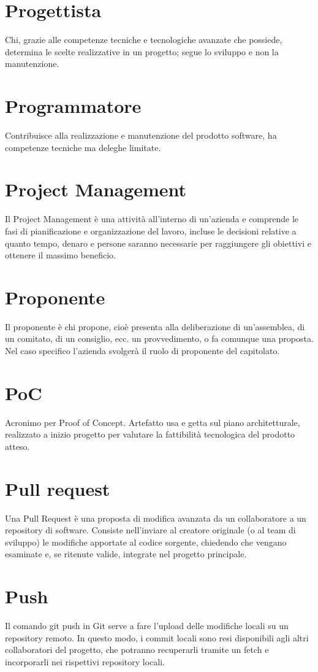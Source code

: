 \section{Progettista}\label{sec:Progettisti}
Chi, grazie alle competenze tecniche e tecnologiche avanzate che possiede, determina le scelte realizzative in un progetto; segue lo sviluppo e non la manutenzione.

\section{Programmatore}\label{sec:Programmatori}
Contribuisce alla realizzazione e manutenzione del prodotto software, ha competenze tecniche ma deleghe limitate.

\section{Project Management}
Il Project Management è una attività all’interno di un’azienda e comprende le fasi di pianificazione e organizzazione del lavoro, incluse le decisioni relative a quanto tempo, denaro e persone saranno necessarie per raggiungere gli obiettivi e ottenere il massimo beneficio. 

\section{Proponente}\label{sec:Proponenti}
Il proponente è chi propone, cioè presenta alla deliberazione di un'assemblea, di un comitato, di un consiglio, ecc. un provvedimento, o fa comunque una proposta. Nel caso specifico l'azienda  svolgerà il ruolo di proponente del capitolato.

\section{PoC}\label{sec:Proof of Concept}
Acronimo per Proof of Concept. Artefatto usa e getta sul piano architetturale, realizzato a inizio progetto per valutare la fattibilità tecnologica del prodotto atteso.

\section{Pull request}
Una Pull Request è una proposta di modifica avanzata da un collaboratore a un repository di software. Consiste nell'inviare al creatore originale (o al team di sviluppo) le modifiche apportate al codice sorgente, chiedendo che vengano esaminate e, se ritenute valide, integrate nel progetto principale.

\section{Push}
Il comando git push in Git serve a fare l’upload delle modifiche locali su un repository remoto. In questo modo, i commit locali sono resi disponibili agli altri collaboratori del progetto, che potranno recuperarli tramite un fetch e incorporarli nei rispettivi repository locali.
